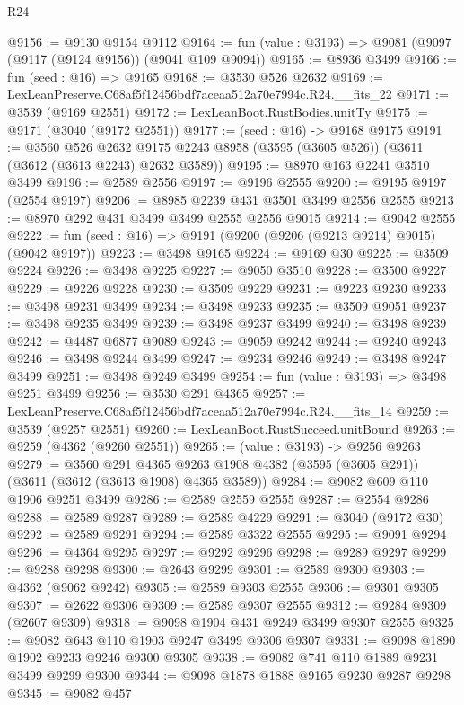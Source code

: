 \begin{lexlean}{R24}
\begin{coremodule}
@9156 := @9130 @9154 @9112
@9164 := fun (value : @3193) => @9081 (@9097 (@9117 (@9124 @9156)) (@9041 @109 @9094))
@9165 := @8936 @3499
@9166 := fun (seed : @16) => @9165
@9168 := @3530 @526 @2632
@9169 := LexLeanPreserve.C68af5f12456bdf7aceaa512a70e7994c.R24.__fits_22
@9171 := @3539 (@9169 @2551)
@9172 := LexLeanBoot.RustBodies.unitTy
@9175 := @9171 (@3040 (@9172 @2551))
@9177 := (seed : @16) -> @9168 @9175
@9191 := @3560
    @526
    @2632
    @9175
    @2243
    @8958
    (@3595 (@3605 @526))
    (@3611 (@3612 (@3613 @2243) @2632 @3589))
@9195 := @8970 @163 @2241 @3510 @3499
@9196 := @2589 @2556
@9197 := @9196 @2555
@9200 := @9195 @9197 (@2554 @9197)
@9206 := @8985 @2239 @431 @3501 @3499 @2556 @2555
@9213 := @8970 @292 @431 @3499 @3499 @2555 @2556 @9015
@9214 := @9042 @2555
@9222 := fun (seed : @16) => @9191 (@9200 (@9206 (@9213 @9214) @9015) (@9042 @9197))
@9223 := @3498 @9165
@9224 := @9169 @30
@9225 := @3509 @9224
@9226 := @3498 @9225
@9227 := @9050 @3510
@9228 := @3500 @9227
@9229 := @9226 @9228
@9230 := @3509 @9229
@9231 := @9223 @9230
@9233 := @3498 @9231 @3499
@9234 := @3498 @9233
@9235 := @3509 @9051
@9237 := @3498 @9235 @3499
@9239 := @3498 @9237 @3499
@9240 := @3498 @9239
@9242 := @4487 @6877 @9089
@9243 := @9059 @9242
@9244 := @9240 @9243
@9246 := @3498 @9244 @3499
@9247 := @9234 @9246
@9249 := @3498 @9247 @3499
@9251 := @3498 @9249 @3499
@9254 := fun (value : @3193) => @3498 @9251 @3499
@9256 := @3530 @291 @4365
@9257 := LexLeanPreserve.C68af5f12456bdf7aceaa512a70e7994c.R24.__fits_14
@9259 := @3539 (@9257 @2551)
@9260 := LexLeanBoot.RustSucceed.unitBound
@9263 := @9259 (@4362 (@9260 @2551))
@9265 := (value : @3193) -> @9256 @9263
@9279 := @3560
    @291
    @4365
    @9263
    @1908
    @4382
    (@3595 (@3605 @291))
    (@3611 (@3612 (@3613 @1908) @4365 @3589))
@9284 := @9082 @609 @110 @1906 @9251 @3499
@9286 := @2589 @2559 @2555
@9287 := @2554 @9286
@9288 := @2589 @9287
@9289 := @2589 @4229
@9291 := @3040 (@9172 @30)
@9292 := @2589 @9291
@9294 := @2589 @3322 @2555
@9295 := @9091 @9294
@9296 := @4364 @9295
@9297 := @9292 @9296
@9298 := @9289 @9297
@9299 := @9288 @9298
@9300 := @2643 @9299
@9301 := @2589 @9300
@9303 := @4362 (@9062 @9242)
@9305 := @2589 @9303 @2555
@9306 := @9301 @9305
@9307 := @2622 @9306
@9309 := @2589 @9307 @2555
@9312 := @9284 @9309 (@2607 @9309)
@9318 := @9098 @1904 @431 @9249 @3499 @9307 @2555
@9325 := @9082 @643 @110 @1903 @9247 @3499 @9306 @9307
@9331 := @9098 @1890 @1902 @9233 @9246 @9300 @9305
@9338 := @9082 @741 @110 @1889 @9231 @3499 @9299 @9300
@9344 := @9098 @1878 @1888 @9165 @9230 @9287 @9298
@9345 := @9082 @457

\end{coremodule}
\end{lexlean}
